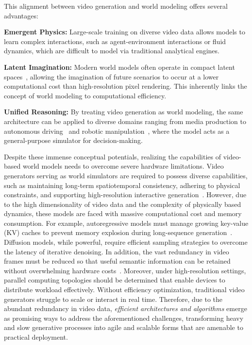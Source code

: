 \documentclass[lettersize,journal]{IEEEtran}
\begin{document}
This alignment between video generation and world modeling offers several advantages:

\textbf{Emergent Physics:} Large-scale training on diverse video data allows models to learn complex interactions, such as agent-environment interactions or fluid dynamics, which are difficult to model via traditional analytical engines.

\textbf{Latent Imagination:} Modern world models often operate in compact latent spaces~\cite{ha2018world, yang2024learning}, allowing the imagination of future scenarios to occur at a lower computational cost than high-resolution pixel rendering. This inherently links the concept of world modeling to computational efficiency.

\textbf{Unified Reasoning:} By treating video generation as world modeling, the same architecture can be applied to diverse domains ranging from media production to autonomous driving~\cite{hu2023gaia, wang2024drivedreamer} and robotic manipulation~\cite{du2023learning}, where the model acts as a general-purpose simulator for decision-making.


Despite these immense conceptual potentials, realizing the capabilities of video-based world models needs to overcome severe hardware limitations. Video generators serving as world simulators are required to possess diverse capabilities, such as maintaining long-term spatiotemporal consistency, adhering to physical constraints, and supporting high-resolution interactive generation~\cite{du2023learning, deepmind_genie3_models}. However, due to the high dimensionality of video data and the complexity of physically based dynamics, these models are faced with massive computational cost and memory consumption. For example, autoregressive models must manage growing key-value (KV) caches to prevent memory explosion during long-sequence generation~\cite{li2025stable, oshima2025worldpack}. Diffusion models, while powerful, require efficient sampling strategies to overcome the latency of iterative denoising. In addition, the vast redundancy in video frames must be reduced so that useful semantic information can be retained without overwhelming hardware costs~\cite{li2024vidtome, chen2025dc}. Moreover, under high-resolution settings, parallel computing topologies should be determined that enable devices to distribute workload effectively. Without efficiency optimization, traditional video generators struggle to scale or interact in real time. Therefore, due to the abundant redundancy in video data, \textit{efficient architectures and algorithms} emerge as promising ways to address the aforementioned challenges, transforming heavy and slow generative processes into agile and scalable forms that are amenable to practical deployment.
\end{document}

